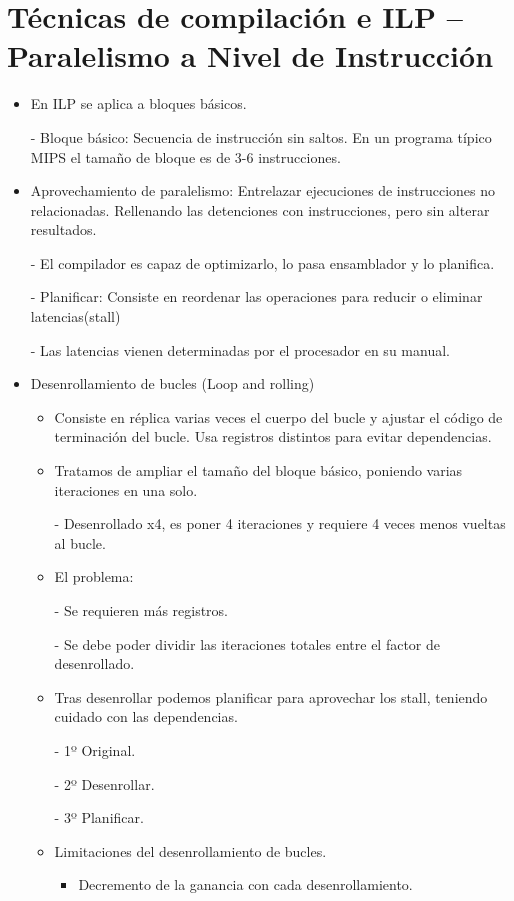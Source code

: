 \documentclass[12pt, twoside, openright]{report} %
\begin{document}
\section{Técnicas de compilación e ILP -- Paralelismo a Nivel de
  Instrucción}

\begin{itemize}
	\item En ILP se aplica a bloques básicos.

	      - Bloque básico: Secuencia de instrucción sin saltos. En un programa típico MIPS el tamaño de bloque es de 3-6 instrucciones.
	\item Aprovechamiento de paralelismo: Entrelazar ejecuciones de instrucciones no relacionadas. Rellenando las detenciones con instrucciones, pero sin alterar resultados.

	      - El compilador es capaz de optimizarlo, lo pasa ensamblador y lo planifica.

	      - Planificar: Consiste en reordenar las operaciones para reducir o eliminar latencias(stall)

	      - Las latencias vienen determinadas por el procesador en su manual.
	\item Desenrollamiento de bucles (Loop and rolling)
	      \begin{itemize}
		      \item Consiste en réplica varias veces el cuerpo del bucle y ajustar el código de terminación del bucle. Usa registros distintos para evitar dependencias.
		      \item Tratamos de ampliar el tamaño del bloque básico, poniendo varias iteraciones en una solo.

		            - Desenrollado x4, es poner 4 iteraciones y requiere 4 veces menos vueltas al bucle.
		      \item El problema:

		            - Se requieren más registros.

		            - Se debe poder dividir las iteraciones totales entre el factor de desenrollado.
		      \item Tras desenrollar podemos planificar para aprovechar los stall, teniendo cuidado con las dependencias.

		            - 1º Original.

		            - 2º Desenrollar.

		            - 3º Planificar.
		      \item Limitaciones del desenrollamiento de bucles.
		            \begin{itemize}
			            \item Decremento de la ganancia con cada desenrollamiento.


\end{itemize}
\end{itemize}
\end{itemize}
\end{document}
